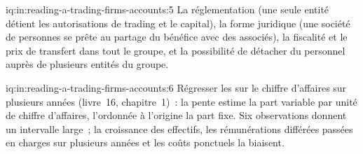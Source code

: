 \begin{solution}{iq:in:reading-a-trading-firms-accounts:5}
La réglementation (une seule entité détient les autorisations de trading et le capital), la forme juridique (une société de personnes se prête au partage du bénéfice
avec des associés), la fiscalité et le prix de transfert dans tout le groupe, et la possibilité de détacher du personnel auprès de plusieurs entités du groupe.
\end{solution}

\begin{solution}{iq:in:reading-a-trading-firms-accounts:6}
Régresser les  sur le chiffre d'affaires sur plusieurs années (livre~16, chapitre~1)~: la pente estime la part variable par unité de
chiffre d'affaires, l'ordonnée à l'origine la part fixe. Six observations donnent un intervalle large~; la croissance des effectifs, les rémunérations différées passées en charges sur
plusieurs années et les coûts ponctuels la biaisent.
\end{solution}
